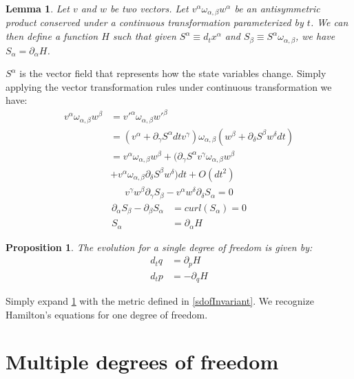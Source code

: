 \documentclass[aps,pra,10pt,twocolumn,floatfix,nofootinbib]{revtex4-1}
\newtheorem{lem}[thm]{Lemma}
\newtheorem{prop}[thm]{Proposition}
\theoremstyle{definition}
\begin{document}
\begin{lem}\label{genAntisim}
Let $v$ and $w$ be two vectors. Let $v^{\alpha} \omega_{\alpha, \beta} w^{\alpha}$ be an antisymmetric product conserved under a continuous transformation parameterized by $t$. We can then define a function $H$ such that given $S^{\alpha} \equiv d_{t}x^{\alpha}$ and $S_{\beta} \equiv S^{\alpha} \omega_{\alpha, \beta}$, we have $S_{\alpha} = \partial_{\alpha}H$.
\end{lem}

$S^{\alpha}$ is the vector field that represents how the state variables change. Simply applying the vector transformation rules under continuous transformation we have:
\begin{align*}
v^{\alpha} \omega_{\alpha, \beta} w^{\beta} &= v'^{\alpha} \omega_{\alpha, \beta} w'^{\beta}  \\
&= (v^{\alpha} + \partial_{\gamma} S^{\alpha} dt v^{\gamma}) \omega_{\alpha, \beta} ( w^{\beta} + \partial_{\delta} S^{\beta} w^{\delta} dt) \\
&= v^{\alpha} \omega_{\alpha, \beta} w^{\beta} + (\partial_{\gamma} S^{\alpha} v^{\gamma} \omega_{\alpha, \beta} w^{\beta} \\
 &+ v^{\alpha} \omega_{\alpha, \beta} \partial_{\delta} S^{\beta} w^{\delta}) dt + O(dt^2)
\end{align*}
\begin{align*}
v^{\gamma} w^{\beta} \partial_{\gamma} S_{\beta} - v^{\alpha} w^{\delta} \partial_{\delta} S_{\alpha} = 0
\end{align*}
\begin{align*}
\partial_{\alpha} S_{\beta} - \partial_{\beta} S_{\alpha} &= curl(S_{\alpha}) = 0 \\
S_{\alpha} &= \partial_{\alpha}H
\end{align*}

\begin{prop}\label{sdofHam}
The evolution for a single degree of freedom is given by:
\begin{align*}
d_{t}q &= \partial_{p} H \\
d_{t}p &= - \partial_{q} H
\end{align*}
\end{prop}

Simply expand \ref{genAntisim} with the metric defined in \ref{sdofInvariant}. We recognize Hamilton's equations for one degree of freedom\cite{classical_dynamics}.

\section{Multiple degrees of freedom}
\end{document}
